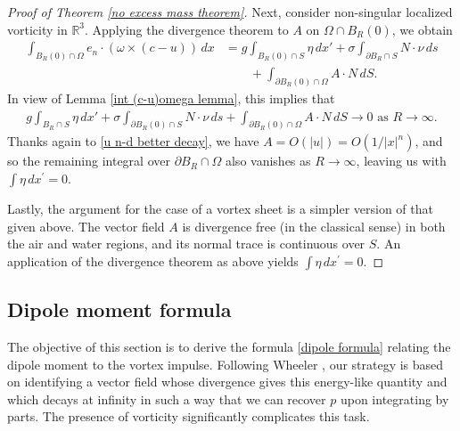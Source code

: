\documentclass[11pt,reqno]{amsart}
\theoremstyle{plain}
\theoremstyle{remark}
\numberwithin{equation}{section}
\begin{document}
\begin{proof}[Proof of Theorem \ref{no excess mass theorem}]
  Next, consider non-singular localized vorticity in $\mathbb R^3$.  Applying the divergence theorem to $A$ on $\Omega \cap B_R(0)$, we obtain
  \begin{equation}
    \begin{split}
      \label{eqn:returntothis}
      \int_{B_R(0) \cap \Omega}
      e_n \cdot (\omega \times (c-u))\, dx
      & =
      g\int_{B_R(0) \cap S} \eta\, dx'
      + \sigma \int_{\partial B_R \cap S} N \cdot \nu\, ds \\
      & \qquad     + \int_{\partial B_R(0) \cap \Omega}  A \cdot N\, dS.
    \end{split} 
\end{equation}
  In view of Lemma \ref{int (c-u)omega lemma}, this implies that 
  \begin{align*}
    \label{eqn:returnedtothis}
    g\int_{B_R \cap S} \eta\, dx'
    + \sigma \int_{\partial B_R(0) \cap S} N \cdot \nu\, ds
    + \int_{\partial B_R(0) \cap \Omega}  A \cdot N\, dS
    \longrightarrow 0 \text{~as~} R \to \infty.
  \end{align*}
  Thanks again to \eqref{u n-d better decay}, we have $A = O(|u|) = O(1/|x|^n)$, and so the remaining integral over $\partial B_R \cap \Omega$ also vanishes as $R \to \infty$, leaving us with $\int \eta \, dx^\prime = 0$.
  
  Lastly, the argument for the case of a vortex sheet is a simpler version of that given above.  The vector field $A$ is divergence free (in the classical sense) in both the air and water regions, and its normal trace is continuous over $S$.  An application of the divergence theorem as above yields $\int \eta \, dx^\prime = 0$.  
  \end{proof}






\subsection{Dipole moment formula}
The objective of this section is to derive the formula \eqref{dipole formula} relating the dipole moment to the vortex impulse.   Following Wheeler \cite{wheeler2016integral}, our strategy is based on identifying a vector field whose divergence gives this energy-like quantity and which decays at infinity in such a way that we can recover $p$ upon integrating by parts.  The presence of vorticity significantly complicates this task.
\end{document}
